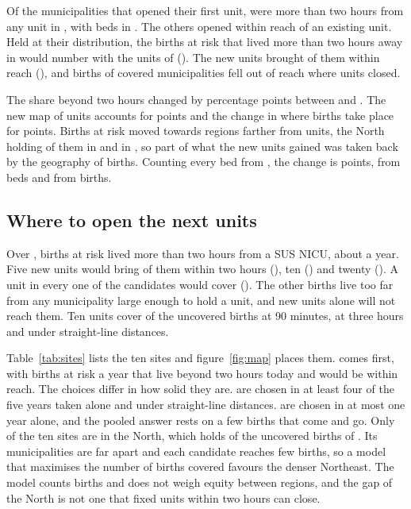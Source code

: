 \documentclass[11pt,a4paper]{article}
\begin{document}
Of the \munOpened{} municipalities that opened their first unit,
\munOpenedBeyond{} were more than two hours from any unit in \firstYear, with
\bedsOpenedBeyond{} beds in \lastYear. The others opened within reach of an
existing unit. Held at their \firstYear{} distribution, the \uncoveredFirst{}
births at risk that lived more than two hours away in \firstYear{} would number
\uncoveredLastMap{} with the units of \lastYear{} (\uncoveredLastMapShare). The
new units brought \broughtWithin{} of them within reach (\broughtWithinShare),
and \fellOut{} births of covered municipalities fell out of reach where units
closed.

The share beyond two hours changed by \changeTotal{} percentage points between
\firstYear{} and \lastYear. The new map of units accounts for \bedsEffect{}
points and the change in where births take place for \birthsEffect{} points.
Births at risk moved towards regions farther from units, the North holding
\norteRiskShareFirst{} of them in \firstYear{} and \norteRiskShareLast{} in
\lastYear, so part of what the new units gained was taken back by the geography
of births. Counting every bed from \allBedsFrom, the change is \allChangeTotal{}
points, \allBedsEffect{} from beds and \allBirthsEffect{} from births.

\subsection{Where to open the next units}
Over \pooledYears, \uncoveredPooled{} births at risk lived more than two hours
from a SUS NICU, about \uncoveredPerYear{} a year. Five new units would bring
\coverFive{} of them within two hours (\shareFive), ten \coverTen{} (\shareTen)
and twenty \coverTwenty{} (\shareTwenty). A unit in every one of the
\candidates{} candidates would cover \ceiling{} (\ceilingShare). The other
\beyondCeiling{} births live too far from any municipality large enough to hold a
unit, and new units alone will not reach them. Ten units cover \tenNinetyShare{}
of the uncovered births at 90 minutes, \tenOneEightyShare{} at three hours and
\tenLineShare{} under straight-line distances.

Table~\ref{tab:sites} lists the ten sites and figure~\ref{fig:map} places them.
\topSite{} comes first, with \topSitePerYear{} births at risk a year that live
beyond two hours today and would be within reach. The choices differ in how solid
they are. \solidSites{} are chosen in at least four of the five years taken alone
and under straight-line distances. \fragileSites{} are chosen in at most one year
alone, and the pooled answer rests on a few births that come and go. Only
\norteSites{} of the ten sites are in the North, which holds \norteFarShare{} of
the uncovered births of \pooledYears. Its municipalities are far apart and each
candidate reaches few births, so a model that maximises the number of births
covered favours the denser Northeast. The model counts births and does not weigh
equity between regions, and the gap of the North is not one that fixed units
within two hours can close.
\end{document}
